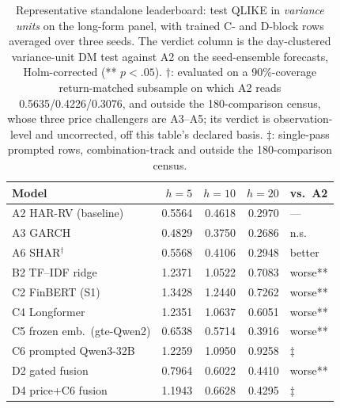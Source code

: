 \begin{table}[tbp]
\centering
\caption[Representative standalone leaderboard]{Representative standalone leaderboard: test QLIKE in \emph{variance units} on the long-form panel, with trained C- and D-block rows averaged over three seeds. The verdict column is the day-clustered variance-unit DM test against A2 on the seed-ensemble forecasts, Holm-corrected (** $p<.05$). $\dagger$: evaluated on a 90\%-coverage return-matched subsample on which A2 reads 0.5635/0.4226/0.3076, and outside the 180-comparison census, whose three price challengers are A3--A5; its verdict is observation-level and uncorrected, off this table's declared basis. $\ddagger$: single-pass prompted rows, combination-track and outside the 180-comparison census.}
\label{tab:res-leaderboard}
\begin{tabular}{@{}lrrrl@{}}
\toprule
Model & $h{=}5$ & $h{=}10$ & $h{=}20$ & vs.\ A2 \\
\midrule
A2 HAR-RV (baseline)         & 0.5564 & 0.4618 & 0.2970 & --- \\ %
A3 GARCH                     & 0.4829 & 0.3750 & 0.2686 & n.s. \\ %
A6 SHAR$^\dagger$            & 0.5568 & 0.4106 & 0.2948 & better \\ %
B2 TF--IDF ridge             & 1.2371 & 1.0522 & 0.7083 & worse** \\ %
C2 FinBERT (S1)              & 1.3428 & 1.2440 & 0.7262 & worse** \\ %
C4 Longformer                & 1.2351 & 1.0637 & 0.6051 & worse** \\ %
C5 frozen emb.\ (gte-Qwen2)  & 0.6538 & 0.5714 & 0.3916 & worse** \\ %
C6 prompted Qwen3-32B        & 1.2259 & 1.0950 & 0.9258 & $\ddagger$ \\ %
D2 gated fusion              & 0.7964 & 0.6022 & 0.4410 & worse** \\ %
D4 price+C6 fusion           & 1.1943 & 0.6628 & 0.4295 & $\ddagger$ \\ %
\bottomrule
\end{tabular}
\end{table}

